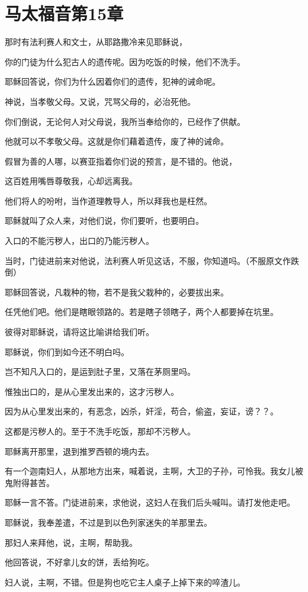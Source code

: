 \documentclass[12pt,oneside]{book}
\begin{document}
\chapter{马太福音第15章}
那时有法利赛人和文士，从耶路撒冷来见耶稣说，

你的门徒为什么犯古人的遗传呢。因为吃饭的时候，他们不洗手。

耶稣回答说，你们为什么因着你们的遗传，犯神的诫命呢。

神说，当孝敬父母。又说，咒骂父母的，必治死他。

你们倒说，无论何人对父母说，我所当奉给你的，已经作了供献。

他就可以不孝敬父母。这就是你们藉着遗传，废了神的诫命。

假冒为善的人哪，以赛亚指着你们说的预言，是不错的。他说，

这百姓用嘴唇尊敬我，心却远离我。

他们将人的吩咐，当作道理教导人，所以拜我也是枉然。

耶稣就叫了众人来，对他们说，你们要听，也要明白。

入口的不能污秽人，出口的乃能污秽人。

当时，门徒进前来对他说，法利赛人听见这话，不服，你知道吗。（不服原文作跌倒）

耶稣回答说，凡栽种的物，若不是我父栽种的，必要拔出来。

任凭他们吧。他们是瞎眼领路的。若是瞎子领瞎子，两个人都要掉在坑里。

彼得对耶稣说，请将这比喻讲给我们听。

耶稣说，你们到如今还不明白吗。

岂不知凡入口的，是运到肚子里，又落在茅厕里吗。

惟独出口的，是从心里发出来的，这才污秽人。

因为从心里发出来的，有恶念，凶杀，奸淫，苟合，偷盗，妄证，谤？？。

这都是污秽人的。至于不洗手吃饭，那却不污秽人。

耶稣离开那里，退到推罗西顿的境内去。

有一个迦南妇人，从那地方出来，喊着说，主啊，大卫的子孙，可怜我。我女儿被鬼附得甚苦。

耶稣一言不答。门徒进前来，求他说，这妇人在我们后头喊叫。请打发他走吧。

耶稣说，我奉差遣，不过是到以色列家迷失的羊那里去。

那妇人来拜他，说，主啊，帮助我。

他回答说，不好拿儿女的饼，丢给狗吃。

妇人说，主啊，不错。但是狗也吃它主人桌子上掉下来的啐渣儿。
\end{document}
